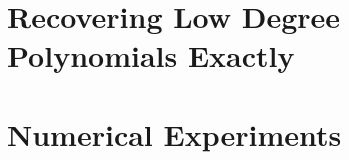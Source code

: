 \documentclass[]{mcom-l}
\theoremstyle{remark}
\begin{document}
\section{Recovering Low Degree Polynomials Exactly}


\section{Numerical Experiments}




\end{document}
